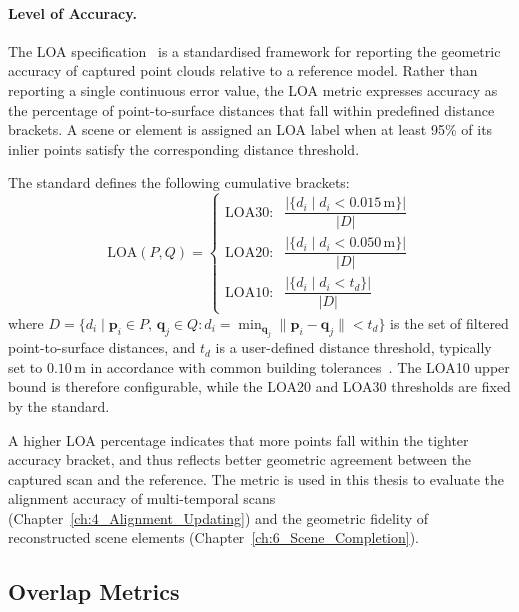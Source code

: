 \paragraph{Level of Accuracy.}
The \gls{LOA} specification~\cite{documentation_usibd_2019} is a standardised framework for reporting the geometric accuracy of captured point clouds relative to a reference model. Rather than reporting a single continuous error value, the LOA metric expresses accuracy as the percentage of point-to-surface distances that fall within predefined distance brackets. A scene or element is assigned an LOA label when at least 95\% of its inlier points satisfy the corresponding distance threshold.



The standard defines the following cumulative brackets:
\begin{equation}
\label{eq:loa}
\text{LOA}(P, Q) =
\begin{cases}
\text{LOA30:} & \dfrac{\bigl|\{d_i \mid d_i < 0.015\,\text{m}\}\bigr|}{|D|} \\[8pt]
\text{LOA20:} & \dfrac{\bigl|\{d_i \mid d_i < 0.050\,\text{m}\}\bigr|}{|D|} \\[8pt]
\text{LOA10:} & \dfrac{\bigl|\{d_i \mid d_i < t_d\}\bigr|}{|D|}
\end{cases}
\end{equation}
where $D = \{d_i \mid \mathbf{p}_i \in P,\, \mathbf{q}_j \in Q : d_i = \min_{\mathbf{q}_j} \|\mathbf{p}_i - \mathbf{q}_j\| < t_d\}$ is the set of filtered point-to-surface distances, and $t_d$ is a user-defined distance threshold, typically set to $0.10\,\text{m}$ in accordance with common building tolerances~\cite{geyter_point_2022}. The LOA10 upper bound is therefore configurable, while the LOA20 and LOA30 thresholds are fixed by the standard.

A higher LOA percentage indicates that more points fall within the tighter accuracy bracket, and thus reflects better geometric agreement between the captured scan and the reference. The metric is used in this thesis to evaluate the alignment accuracy of multi-temporal scans (Chapter~\ref{ch:4_Alignment_Updating}) and the geometric fidelity of reconstructed scene elements (Chapter~\ref{ch:6_Scene_Completion}).

\subsection{Overlap Metrics}
\label{sec:bg_metrics_overlap}

